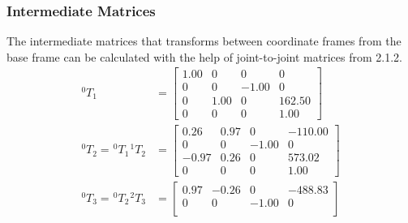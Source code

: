 \subsubsection{Intermediate Matrices}
The intermediate matrices that transforms between coordinate frames from the base frame can be calculated with the help of joint-to-joint matrices from 2.1.2.
\begin{equation*}
    \begin{split}
        ^{0}T_{1}                                                 & = \begin{bmatrix}
                                                                          1.00 & 0    & 0     & 0      \\
                                                                          0    & 0    & -1.00 & 0      \\
                                                                          0    & 1.00 & 0     & 162.50 \\
                                                                          0    & 0    & 0     & 1.00
                                                                      \end{bmatrix}    \\
        ^{0}T_{2} = \hspace{1pt} ^{0}T_{1} \hspace{1pt} ^{1}T_{2} & = \begin{bmatrix}
                                                                          0.26  & 0.97 & 0     & -110.00 \\
                                                                          0     & 0    & -1.00 & 0       \\
                                                                          -0.97 & 0.26 & 0     & 573.02  \\
                                                                          0     & 0    & 0     & 1.00
                                                                      \end{bmatrix}  \\
        ^{0}T_{3} = \hspace{1pt} ^{0}T_{2} \hspace{1pt} ^{2}T_{3} & = \begin{bmatrix}
                                                                          0.97 & -0.26 & 0     & -488.83 \\
                                                                          0    & 0     & -1.00 & 0       \\

\end{bmatrix}
\end{split}
\end{equation*}
